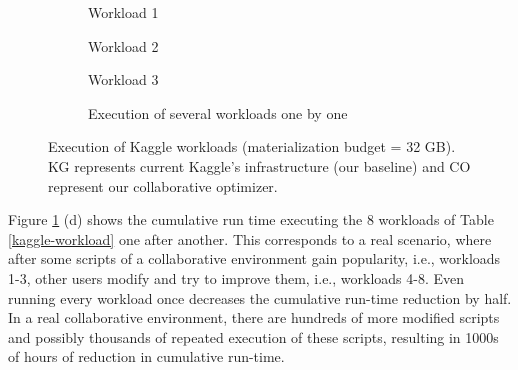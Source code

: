 \begin{figure}
\begin{subfigure}[b]{0.33\linewidth}
\centering
 \resizebox{\columnwidth}{!}{%
%
}

\caption{Workload 1}
\end{subfigure}%
\begin{subfigure}[b]{0.33\linewidth}
\centering
 \resizebox{\columnwidth}{!}{%
%
}

\caption{Workload 2}
\end{subfigure}%
\begin{subfigure}[b]{0.33\linewidth}
\centering
 \resizebox{\columnwidth}{!}{%
%
}
\caption{Workload 3}
\end{subfigure}
\begin{subfigure}[b]{\linewidth}
\centering
 \resizebox{\columnwidth}{!}{%
%
}
\caption{Execution of several workloads one by one}
\end{subfigure}
\caption{Execution of Kaggle workloads (materialization budget = 32 GB). KG represents current Kaggle's infrastructure (our baseline) and CO represent our collaborative optimizer.}
\label{exp-reuse-kaggle-same-workload}
\end{figure}

Figure \ref{exp-reuse-kaggle-same-workload} (d) shows the cumulative run time executing the 8 workloads of Table \ref{kaggle-workload} one after another.
This corresponds to a real scenario, where after some scripts of a collaborative environment gain popularity, i.e., workloads 1-3, other users modify and try to improve them, i.e., workloads 4-8.
Even running every workload once decreases the cumulative run-time reduction by half.
In a real collaborative environment, there are hundreds of more modified scripts and possibly thousands of repeated execution of these scripts, resulting in 1000s of hours of reduction in cumulative run-time.


